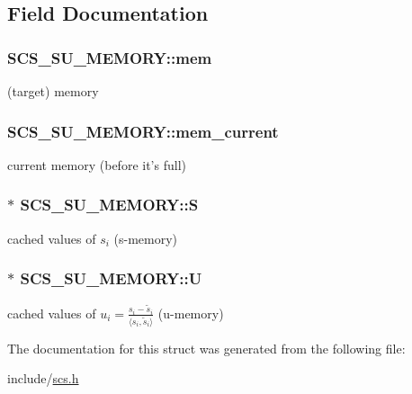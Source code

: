 \subsection{Field Documentation}
\hypertarget{struct_s_c_s___s_u___m_e_m_o_r_y_a2adf52e26eab40e526b88f0576713bad}{
\subsubsection[{mem}]{ S\-C\-S\-\_\-\-S\-U\-\_\-\-M\-E\-M\-O\-R\-Y\-::mem}}\label{struct_s_c_s___s_u___m_e_m_o_r_y_a2adf52e26eab40e526b88f0576713bad}
(target) memory \hypertarget{struct_s_c_s___s_u___m_e_m_o_r_y_a8ff7e7d7b7c9aafbc1b230a62edec9d7}{
\subsubsection[{mem\-\_\-current}]{ S\-C\-S\-\_\-\-S\-U\-\_\-\-M\-E\-M\-O\-R\-Y\-::mem\-\_\-current}}\label{struct_s_c_s___s_u___m_e_m_o_r_y_a8ff7e7d7b7c9aafbc1b230a62edec9d7}
current memory (before it's full) \hypertarget{struct_s_c_s___s_u___m_e_m_o_r_y_aac89225fdd99a98b9e209a434a7fd037}{
\subsubsection[{S}]{$\ast$ S\-C\-S\-\_\-\-S\-U\-\_\-\-M\-E\-M\-O\-R\-Y\-::\-S}}\label{struct_s_c_s___s_u___m_e_m_o_r_y_aac89225fdd99a98b9e209a434a7fd037}
cached values of $s_i$ (s-\/memory) \hypertarget{struct_s_c_s___s_u___m_e_m_o_r_y_a2597c54d6bdb9c4950b1c214f5b7f9f3}{
\subsubsection[{U}]{$\ast$ S\-C\-S\-\_\-\-S\-U\-\_\-\-M\-E\-M\-O\-R\-Y\-::\-U}}\label{struct_s_c_s___s_u___m_e_m_o_r_y_a2597c54d6bdb9c4950b1c214f5b7f9f3}
cached values of $u_i = \frac{s_i - \tilde{s}_i}{\langle s_i, \tilde{s}_i\rangle}$ (u-\/memory) 

The documentation for this struct was generated from the following file\-:\begin{DoxyCompactItemize}
\item 
include/\hyperlink{scs_8h}{scs.\-h}\end{DoxyCompactItemize}

